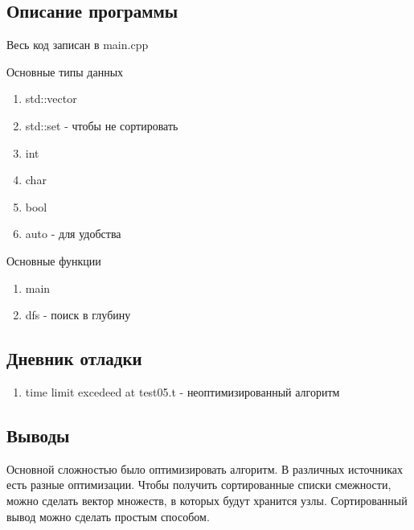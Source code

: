 \documentclass[12pt]{article}
\begin{document}
\subsection*{Описание программы}

Весь код записан в main.cpp

Основные типы данных
\begin{enumerate}
\item std::vector
\item std::set - чтобы не сортировать
\item int
\item char
\item bool
\item auto - для удобства
\end{enumerate}

Основные функции
\begin{enumerate}
\item main
\item dfs - поиск в глубину
\end{enumerate}

\subsection*{Дневник отладки}

\begin{enumerate}
\item time limit excedeed at test05.t - неоптимизированный алгоритм
\end{enumerate}

\subsection*{Выводы}

Основной сложностью было оптимизировать алгоритм. В различных источниках есть разные оптимизации. Чтобы получить сортированные списки смежности, можно сделать вектор множеств, в которых будут хранится узлы. Сортированный вывод можно сделать простым способом.
\end{document}
